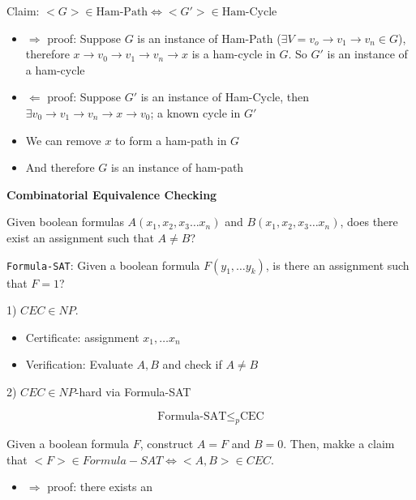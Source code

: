 \documentclass[../notes.tex]{subfiles}
\begin{document}
\begin{example}
	Claim: $ <G> \in\text{Ham-Path} \Leftrightarrow <G'> \in \text{Ham-Cycle}$


	\begin{itemize}
		\item $ \Rightarrow $ proof: Suppose $ G $ is an instance of Ham-Path ($ \exists V = v_o \to v_1 \to v_n  \in G $), therefore $ x \to v_0 \to v_1 \to v_n \to x$ is a ham-cycle in $ G $. So $ G' $ is an instance of a ham-cycle
		\item $ \Leftarrow $ proof: Suppose $ G' $ is an instance of Ham-Cycle, then $ \exists v_0 \to v_1 \to  v_n \to  x \to  v_0 $; a known cycle in $ G' $
		\item We can remove $ x $ to form a ham-path in $ G $
		\item And therefore $ G $ is an instance of ham-path
	\end{itemize}
	
\end{example}


\begin{definition}
	\textbf{Combinatorial Equivalence Checking} 


	Given boolean formulas $ A(x_1, x_2, x_3 \ldots x_n) $ and  $  B(x_1, x_2, x_3 \ldots x_n)  $, does there exist an assignment such that $ A \neq B $?

	\texttt{Formula-SAT}: Given a boolean formula $ F(y_1, \ldots y_k) $, is there an assignment such that $ F = 1 $?


\end{definition}


\begin{example}
	1) $ CEC \in NP $. 

	\begin{itemize}
		\item Certificate: assignment $ x_1, \ldots x_n $
		\item Verification: Evaluate $ A, B $ and check if $ A \neq B $
	\end{itemize}

	2) $ CEC \in NP $-hard via Formula-SAT

	\begin{equation}
		\text{Formula-SAT} \le_p \text{CEC}
	\end{equation}

	Given a boolean formula $ F $, construct $ A = F $ and $ B = 0 $. Then, makke a claim that $ <F> \in Formula-SAT \Leftrightarrow <A,B> \in CEC $.


	\begin{itemize}
		\item $ \Rightarrow $ proof: there exists an 
	\end{itemize}

	
	




\end{example}
\end{document}
